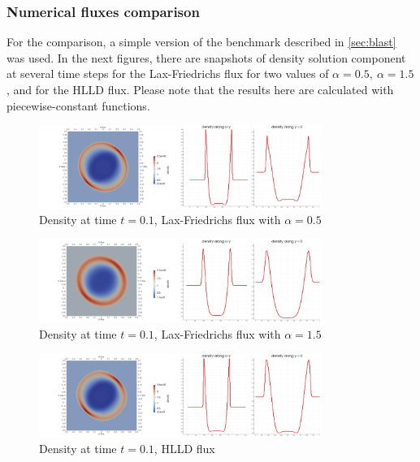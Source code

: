 \subsubsection{Numerical fluxes comparison}
\label{subsec:numfluxcomp}
For the comparison, a simple version of the benchmark described in \ref{sec:blast} was used. In the next figures, there are snapshots of density solution component at several time steps for the Lax-Friedrichs flux for two values of $\alpha = 0.5,\ \alpha=1.5$, and for the HLLD flux. Please note that the results here are calculated with piecewise-constant functions.
	\begin{figure}[H]
		\begin{center}
			\includegraphics[width=0.82\textwidth]{img/numflux/lf1.jpg}
			\vspace{-3mm}
			\caption{Density at time $t = 0.1$, Lax-Friedrichs flux with $\alpha = 0.5$}
		\end{center}
	\end{figure}\vspace{-5mm}
	\begin{figure}[H]
		\begin{center}
			\includegraphics[width=0.82\textwidth]{img/numflux/lfw1.jpg}
			\vspace{-3mm}
		\caption{Density at time $t = 0.1$, Lax-Friedrichs flux with $\alpha = 1.5$}
		\end{center}
	\end{figure}\vspace{-5mm}
	\begin{figure}[H]
		\begin{center}
			\includegraphics[width=0.82\textwidth]{img/numflux/hl1.jpg}
			\vspace{-3mm}
		\caption{Density at time $t = 0.1$, HLLD flux}
		\end{center}
	\end{figure}\vspace{-5mm}
	\newpage
	
